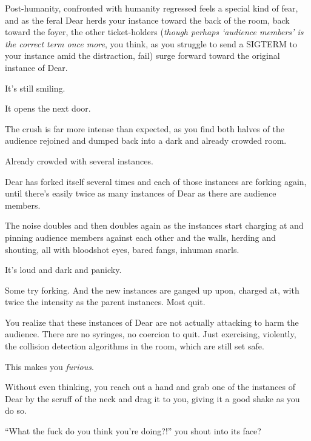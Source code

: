 Post-humanity, confronted with humanity regressed feels a special kind of fear, and as the feral Dear herds your instance toward the back of the room, back toward the foyer, the other ticket-holders (\emph{though perhaps `audience members' is the correct term once more}, you think, as you struggle to send a SIGTERM to your instance amid the distraction, fail) surge forward toward the original instance of Dear.

\newpage

\null
\vfill

It's still smiling.

\null
\vfill

\newpage
\null
\vfill

It opens the next door.

\vfill

\newpage

The crush is far more intense than expected, as you find both halves of the audience rejoined and dumped back into a dark and already crowded room.

Already crowded with several instances.

Dear has forked itself several times and each of those instances are forking again, until there's easily twice as many instances of Dear as there are audience members.

The noise doubles and then doubles again as the instances start charging at and pinning audience members against each other and the walls, herding and shouting, all with bloodshot eyes, bared fangs, inhuman snarls.

It's loud and dark and panicky.

Some try forking. And the new instances are ganged up upon, charged at, with twice the intensity as the parent instances. Most quit.

You realize that these instances of Dear are not actually attacking to harm the audience. There are no syringes, no coercion to quit. Just exercising, violently, the collision detection algorithms in the room, which are still set safe.

This makes you \emph{furious}.


Without even thinking, you reach out a hand and grab one of the instances of Dear by the scruff of the neck and drag it to you, giving it a good shake as you do so.

``What the fuck do you think you're doing?!'' you shout into its face?

